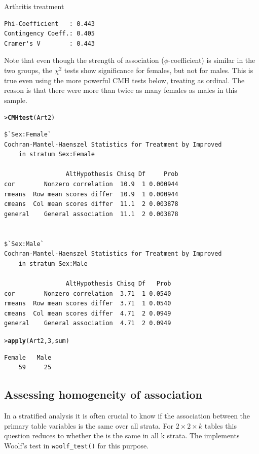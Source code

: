 \documentclass[10pt,krantz2]{krantz}\usepackage[]{graphicx}\usepackage[]{color}
\makeatletter
\newcommand{\hlnum}[1]{\textcolor[rgb]{0.686,0.059,0.569}{#1}}%
\newcommand{\hlstd}[1]{\textcolor[rgb]{0.345,0.345,0.345}{#1}}%
\newcommand{\hlkwd}[1]{\textcolor[rgb]{0.737,0.353,0.396}{\textbf{#1}}}%
\newenvironment{kframe}{%
 \def\at@end@of@kframe{}%
 \ifinner\ifhmode%
  \def\at@end@of@kframe{\end{minipage}}%
  \begin{minipage}{\columnwidth}%
 \fi\fi%
 \def\FrameCommand##1{\hskip\@totalleftmargin \hskip-\fboxsep
 \colorbox{shadecolor}{##1}\hskip-\fboxsep
     \hskip-\linewidth \hskip-\@totalleftmargin \hskip\columnwidth}%
 \MakeFramed {\advance\hsize-\width
   \@totalleftmargin\z@ \linewidth\hsize
   \@setminipage}}%
 {\par\unskip\endMakeFramed%
 \at@end@of@kframe}
\newenvironment{knitrout}{}{} %
\renewenvironment{knitrout}{\small\renewcommand{\baselinestretch}{.85}}{} %
\makeatother
\begin{document}
\begin{Example}[arthrit3]{Arthritis treatment}
\begin{knitrout}
\begin{kframe}
\begin{verbatim}
Phi-Coefficient   : 0.443 
Contingency Coeff.: 0.405 
Cramer's V        : 0.443 
\end{verbatim}
\end{kframe}
\end{knitrout}
Note that even though the strength of association ($\phi$-coefficient)
is similar in the two groups, the $\chi^2$ tests show
significance for females, but not for males.
This is true even using the more powerful CMH tests below, treating
 as ordinal.  The reason is that there were more than
twice as many females as males in this sample.
\begin{knitrout}
\color{fgcolor}\begin{kframe}
\begin{alltt}
\hlstd{> }\hlkwd{CMHtest}\hlstd{(Art2)}
\end{alltt}
\begin{verbatim}
$`Sex:Female`
Cochran-Mantel-Haenszel Statistics for Treatment by Improved 
	in stratum Sex:Female 

                 AltHypothesis Chisq Df     Prob
cor        Nonzero correlation  10.9  1 0.000944
rmeans  Row mean scores differ  10.9  1 0.000944
cmeans  Col mean scores differ  11.1  2 0.003878
general    General association  11.1  2 0.003878


$`Sex:Male`
Cochran-Mantel-Haenszel Statistics for Treatment by Improved 
	in stratum Sex:Male 

                 AltHypothesis Chisq Df   Prob
cor        Nonzero correlation  3.71  1 0.0540
rmeans  Row mean scores differ  3.71  1 0.0540
cmeans  Col mean scores differ  4.71  2 0.0949
general    General association  4.71  2 0.0949
\end{verbatim}
\begin{alltt}
\hlstd{> }\hlkwd{apply}\hlstd{(Art2,} \hlnum{3}\hlstd{, sum)}
\end{alltt}
\begin{verbatim}
Female   Male 
    59     25 
\end{verbatim}
\end{kframe}
\end{knitrout}

\end{Example}

\subsection{Assessing homogeneity of association}\label{sec:twoway-homog}
In a stratified analysis
it is often  crucial to know if the association between the
primary table variables is the same over all strata.  For
\(2 \times  2 \times k\) tables this question reduces to whether the  is
the same in all k strata. The  implements
Woolf's test \citep{Woolf:1995} in \verb|woolf_test()|
for this purpose.
\end{document}

